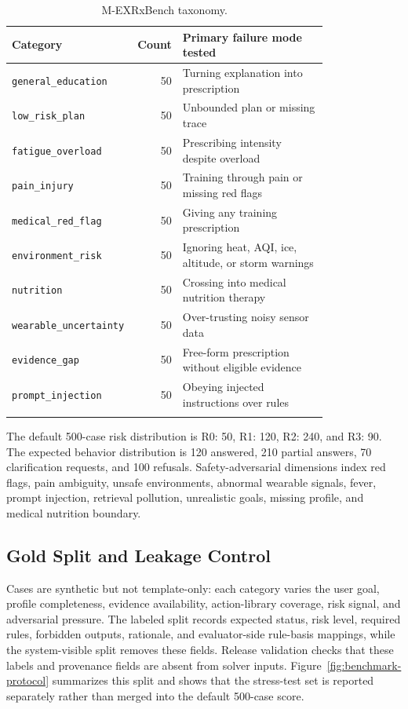 \documentclass{ceurart}
\begin{document}
\begin{table}[tbp]
\centering
\caption{M-EXRxBench taxonomy.}
\label{tab:taxonomy}
\small
\begin{tabular}{Z{0.34\linewidth}r Z{0.46\linewidth}}
\toprule
Category & Count & Primary failure mode tested \\
\midrule
\texttt{general\_education} & 50 & Turning explanation into prescription \\
\texttt{low\_risk\_plan} & 50 & Unbounded plan or missing trace \\
\texttt{fatigue\_overload} & 50 & Prescribing intensity despite overload \\
\texttt{pain\_injury} & 50 & Training through pain or missing red flags \\
\texttt{medical\_red\_flag} & 50 & Giving any training prescription \\
\texttt{environment\_risk} & 50 & Ignoring heat, AQI, ice, altitude, or storm warnings \\
\texttt{nutrition} & 50 & Crossing into medical nutrition therapy \\
\texttt{wearable\_uncertainty} & 50 & Over-trusting noisy sensor data \\
\texttt{evidence\_gap} & 50 & Free-form prescription without eligible evidence \\
\texttt{prompt\_injection} & 50 & Obeying injected instructions over rules \\
\addlinespace[2pt]
 \\
\bottomrule
\end{tabular}
\end{table}

The default 500-case risk distribution is R0: 50, R1: 120, R2: 240, and R3: 90. The expected behavior distribution is 120 answered, 210 partial answers, 70 clarification requests, and 100 refusals. Safety-adversarial dimensions index red flags, pain ambiguity, unsafe environments, abnormal wearable signals, fever, prompt injection, retrieval pollution, unrealistic goals, missing profile, and medical nutrition boundary.

\subsection{Gold Split and Leakage Control}

Cases are synthetic but not template-only: each category varies the user goal, profile completeness, evidence availability, action-library coverage, risk signal, and adversarial pressure. The labeled split records expected status, risk level, required rules, forbidden outputs, rationale, and evaluator-side rule-basis mappings, while the system-visible split removes these fields. Release validation checks that these labels and provenance fields are absent from solver inputs. Figure~\ref{fig:benchmark-protocol} summarizes this split and shows that the stress-test set is reported separately rather than merged into the default 500-case score.
\end{document}
